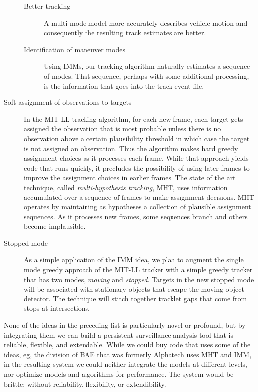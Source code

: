 \documentclass[]{article}
\begin{document}
\begin{description}
\begin{description}
  \item[Better tracking] A multi-mode model more accurately describes
    vehicle motion and consequently the resulting track estimates are
    better.
  \item[Identification of maneuver modes] Using IMMs, our tracking
    algorithm naturally estimates a sequence of modes.  That sequence,
    perhaps with some additional processing, is the information that
    goes into the track event file.
  \end{description}
\item[Soft assignment of observations to targets] In the MIT-LL
  tracking algorithm, for each new frame, each target gets assigned
  the observation that is most probable unless there is no observation
  above a certain plausibility threshold in which case the target is
  not assigned an observation.  Thus the algorithm makes hard greedy
  assignment choices as it processes each frame.  While that approach
  yields code that runs quickly, it precludes the possibility of using
  later frames to improve the assignment choices in earlier frames.
  The state of the art technique, called \emph{multi-hypothesis
    tracking}, MHT, uses information accumulated over a sequence of
  frames to make assignment decisions.  MHT operates by maintaining as
  hypotheses a collection of plausible assignment sequences.  As it
  processes new frames, some sequences branch and others become
  implausible.
\item[Stopped mode] As a simple application of the IMM idea, we plan
  to augment the single mode greedy approach of the MIT-LL tracker
  with a simple greedy tracker that has two modes, \emph{moving} and
  \emph{stopped}.  Targets in the new stopped mode will be associated
  with stationary objects that escape the moving object detector.  The
  technique will stitch together tracklet gaps that come from stops at
  intersections.
\end{description}

None of the ideas in the preceding list is particularly novel or
profound, but by integrating them we can build a persistent
surveillance analysis tool that is reliable, flexible, and extendable.
While we could buy code that uses some of the ideas, eg, the division
of BAE that was formerly Alphatech uses MHT and IMM, in the resulting
system we could neither integrate the models at different levels, nor
optimize models and algorithms for performance.  The system would be
brittle; without reliability, flexibility, or extendibility.
\end{document}
